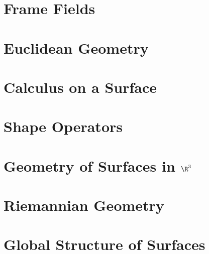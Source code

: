 \newpage
\section{Frame Fields}
\section{Euclidean Geometry}
\section{Calculus on a Surface}
\section{Shape Operators}
\section{Geometry of Surfaces in ${\R}^{3}$}
\section{Riemannian Geometry}
\section{Global Structure of Surfaces}